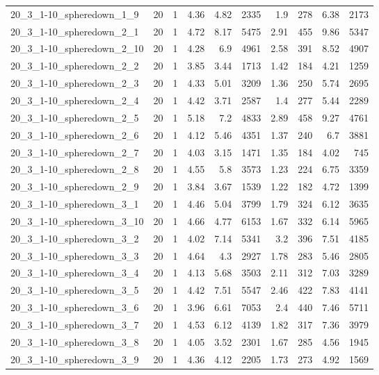 \begin{center}
\begin{scriptsize}
\begin{longtable}{lrrrrrrrrr}
20\_3\_1-10\_spheredown\_1\_9 & 20 & 1 & 4.36 & 4.82 & 2335 & 1.9 & 278 & 6.38 & 2173\\
20\_3\_1-10\_spheredown\_2\_1 & 20 & 1 & 4.72 & 8.17 & 5475 & 2.91 & 455 & 9.86 & 5347\\
20\_3\_1-10\_spheredown\_2\_10 & 20 & 1 & 4.28 & 6.9 & 4961 & 2.58 & 391 & 8.52 & 4907\\
20\_3\_1-10\_spheredown\_2\_2 & 20 & 1 & 3.85 & 3.44 & 1713 & 1.42 & 184 & 4.21 & 1259\\
20\_3\_1-10\_spheredown\_2\_3 & 20 & 1 & 4.33 & 5.01 & 3209 & 1.36 & 250 & 5.74 & 2695\\
20\_3\_1-10\_spheredown\_2\_4 & 20 & 1 & 4.42 & 3.71 & 2587 & 1.4 & 277 & 5.44 & 2289\\
20\_3\_1-10\_spheredown\_2\_5 & 20 & 1 & 5.18 & 7.2 & 4833 & 2.89 & 458 & 9.27 & 4761\\
20\_3\_1-10\_spheredown\_2\_6 & 20 & 1 & 4.12 & 5.46 & 4351 & 1.37 & 240 & 6.7 & 3881\\
20\_3\_1-10\_spheredown\_2\_7 & 20 & 1 & 4.03 & 3.15 & 1471 & 1.35 & 184 & 4.02 & 745\\
20\_3\_1-10\_spheredown\_2\_8 & 20 & 1 & 4.55 & 5.8 & 3573 & 1.23 & 224 & 6.75 & 3359\\
20\_3\_1-10\_spheredown\_2\_9 & 20 & 1 & 3.84 & 3.67 & 1539 & 1.22 & 182 & 4.72 & 1399\\
20\_3\_1-10\_spheredown\_3\_1 & 20 & 1 & 4.46 & 5.04 & 3799 & 1.79 & 324 & 6.12 & 3635\\
20\_3\_1-10\_spheredown\_3\_10 & 20 & 1 & 4.66 & 4.77 & 6153 & 1.67 & 332 & 6.14 & 5965\\
20\_3\_1-10\_spheredown\_3\_2 & 20 & 1 & 4.02 & 7.14 & 5341 & 3.2 & 396 & 7.51 & 4185\\
20\_3\_1-10\_spheredown\_3\_3 & 20 & 1 & 4.64 & 4.3 & 2927 & 1.78 & 283 & 5.46 & 2805\\
20\_3\_1-10\_spheredown\_3\_4 & 20 & 1 & 4.13 & 5.68 & 3503 & 2.11 & 312 & 7.03 & 3289\\
20\_3\_1-10\_spheredown\_3\_5 & 20 & 1 & 4.42 & 7.51 & 5547 & 2.46 & 422 & 7.83 & 4141\\
20\_3\_1-10\_spheredown\_3\_6 & 20 & 1 & 3.96 & 6.61 & 7053 & 2.4 & 440 & 7.46 & 5711\\
20\_3\_1-10\_spheredown\_3\_7 & 20 & 1 & 4.53 & 6.12 & 4139 & 1.82 & 317 & 7.36 & 3979\\
20\_3\_1-10\_spheredown\_3\_8 & 20 & 1 & 4.05 & 3.52 & 2301 & 1.67 & 285 & 4.56 & 1945\\
20\_3\_1-10\_spheredown\_3\_9 & 20 & 1 & 4.36 & 4.12 & 2205 & 1.73 & 273 & 4.92 & 1569\\

\end{longtable}
\end{scriptsize}
\end{center}
